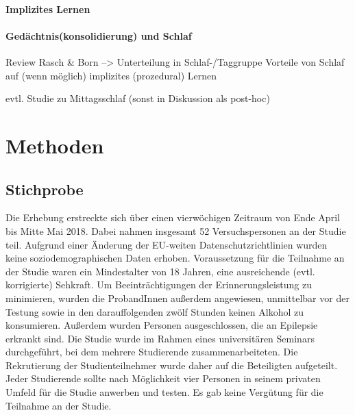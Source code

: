 


\paragraph{Implizites Lernen}





\paragraph{Gedächtnis(konsolidierung) und Schlaf}
Review Rasch \& Born
--> Unterteilung in Schlaf-/Taggruppe
Vorteile von Schlaf auf (wenn möglich) implizites (prozedural) Lernen

evtl. Studie zu Mittagsschlaf (sonst in Diskussion als post-hoc)


\section{Methoden}
\label{S:2}

\subsection{Stichprobe}
Die Erhebung erstreckte sich über einen vierwöchigen Zeitraum von Ende April bis Mitte Mai 2018. Dabei nahmen insgesamt 52 Versuchspersonen an der Studie teil. Aufgrund einer Änderung der  EU-weiten Datenschutzrichtlinien wurden keine soziodemographischen Daten erhoben. Voraussetzung für die Teilnahme an der Studie waren ein Mindestalter von 18 Jahren, eine ausreichende (evtl. korrigierte) Sehkraft. Um Beeinträchtigungen der Erinnerungsleistung zu minimieren, wurden die ProbandInnen außerdem angewiesen, unmittelbar vor der Testung sowie in den darauffolgenden zwölf Stunden keinen Alkohol zu konsumieren. Außerdem wurden Personen ausgeschlossen, die an Epilepsie erkrankt sind.
Die Studie wurde im Rahmen eines universitären Seminars durchgeführt, bei dem mehrere Studierende zusammenarbeiteten. Die Rekrutierung der Studienteilnehmer wurde daher auf die Beteiligten aufgeteilt. Jeder Studierende sollte nach Möglichkeit vier Personen in seinem privaten Umfeld für die Studie anwerben und testen. Es gab keine Vergütung für die Teilnahme an der Studie.


